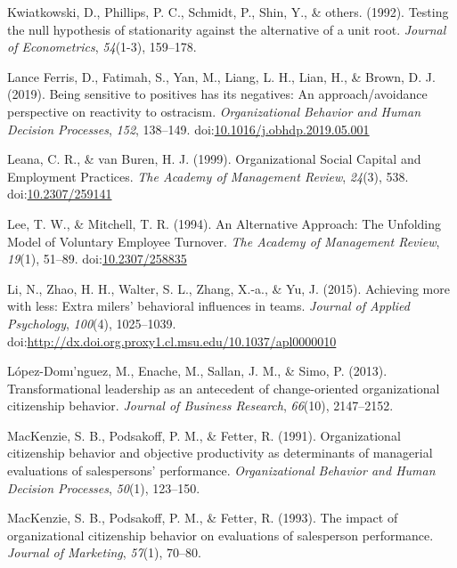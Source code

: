 \documentclass[english,,man]{apa6}
\theoremstyle{definition}
\theoremstyle{definition}
\theoremstyle{definition}
\theoremstyle{remark}
\begin{document}
\leavevmode\hypertarget{ref-kwiatkowski1992testing}{}%
Kwiatkowski, D., Phillips, P. C., Schmidt, P., Shin, Y., \& others.
(1992). Testing the null hypothesis of stationarity against the
alternative of a unit root. \emph{Journal of Econometrics},
\emph{54}(1-3), 159--178.

\leavevmode\hypertarget{ref-lance_ferris_being_2019}{}%
Lance Ferris, D., Fatimah, S., Yan, M., Liang, L. H., Lian, H., \&
Brown, D. J. (2019). Being sensitive to positives has its negatives: An
approach/avoidance perspective on reactivity to ostracism.
\emph{Organizational Behavior and Human Decision Processes}, \emph{152},
138--149.
doi:\href{https://doi.org/10.1016/j.obhdp.2019.05.001}{10.1016/j.obhdp.2019.05.001}

\leavevmode\hypertarget{ref-leana_organizational_1999}{}%
Leana, C. R., \& van Buren, H. J. (1999). Organizational Social Capital
and Employment Practices. \emph{The Academy of Management Review},
\emph{24}(3), 538.
doi:\href{https://doi.org/10.2307/259141}{10.2307/259141}

\leavevmode\hypertarget{ref-lee_alternative_1994}{}%
Lee, T. W., \& Mitchell, T. R. (1994). An Alternative Approach: The
Unfolding Model of Voluntary Employee Turnover. \emph{The Academy of
Management Review}, \emph{19}(1), 51--89.
doi:\href{https://doi.org/10.2307/258835}{10.2307/258835}

\leavevmode\hypertarget{ref-li_achieving_2015}{}%
Li, N., Zhao, H. H., Walter, S. L., Zhang, X.-a., \& Yu, J. (2015).
Achieving more with less: Extra milers' behavioral influences in teams.
\emph{Journal of Applied Psychology}, \emph{100}(4), 1025--1039.
doi:\href{https://doi.org/http://dx.doi.org.proxy1.cl.msu.edu/10.1037/apl0000010}{http://dx.doi.org.proxy1.cl.msu.edu/10.1037/apl0000010}

\leavevmode\hypertarget{ref-lopez2013transformational}{}%
López-Domı'nguez, M., Enache, M., Sallan, J. M., \& Simo, P. (2013).
Transformational leadership as an antecedent of change-oriented
organizational citizenship behavior. \emph{Journal of Business
Research}, \emph{66}(10), 2147--2152.

\leavevmode\hypertarget{ref-mackenzie1991organizational}{}%
MacKenzie, S. B., Podsakoff, P. M., \& Fetter, R. (1991). Organizational
citizenship behavior and objective productivity as determinants of
managerial evaluations of salespersons' performance.
\emph{Organizational Behavior and Human Decision Processes},
\emph{50}(1), 123--150.

\leavevmode\hypertarget{ref-mackenzie1993impact}{}%
MacKenzie, S. B., Podsakoff, P. M., \& Fetter, R. (1993). The impact of
organizational citizenship behavior on evaluations of salesperson
performance. \emph{Journal of Marketing}, \emph{57}(1), 70--80.
\end{document}
